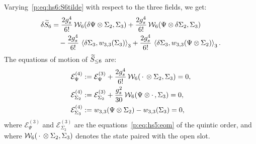 Varying~\eqref{p:eq:hs6:S6tilde} with respect to the three fields, we get:
\begin{equation}
  \label{p:eq:hs6:delta-S}
  \begin{aligned}
    \delta \caction[6]
      &
      = \frac{2 \gs^4}{6!} \, \dvertex{6}(\delta \Psi \otimes \Sigma_2, \Sigma_3)
        + \frac{2 \gs^4}{6!} \, \dvertex{6}(\Psi \otimes \delta \Sigma_2, \Sigma_3)
      \\ &
      \quad
      - \frac{2 \gs^4}{6!} \, \pair[3]{\delta \Sigma_3}{\wprod{3}{3}(\Sigma_3)}
        + \frac{2 \gs^4}{6!} \, \pair[3]{\delta \Sigma_3}{\wprod{3}{3}(\Psi \otimes \Sigma_2)}.
  \end{aligned}
\end{equation}
The equations of motion of $\caction[\le 6]$ are:
\begin{subequations}
  \label{p:eq:hs6:eom}
  \begin{align}
    \label{p:eq:hs6:eom-psi}
    \mathcal E^{(4)}_\Psi
      &
      := \mathcal E^{(3)}_\Psi
        + \frac{2 \gs^4}{6!} \, \dvertex{6}(\, \cdot \, \otimes \Sigma_2, \Sigma_3)
      = 0,
    \\
    \label{p:eq:hs6:eom-sigma2}
    \mathcal E^{(4)}_{\Sigma_2}
      &
      := \mathcal E^{(3)}_{\Sigma_2}
        + \frac{\gs^2}{30} \, \dvertex{6}(\Psi \otimes \cdot \,, \Sigma_3)
      = 0,
    \\
    \label{p:eq:hs6:eom-sigma3}
    \mathcal E^{(4)}_{\Sigma_3}
      &
      := \wprod{3}{3}(\Psi \otimes \Sigma_2) - \wprod{3}{3}(\Sigma_3)
      = 0,
  \end{align}
\end{subequations}
where $\mathcal E^{(3)}_\Psi$ and $\mathcal E^{(3)}_{\Sigma_2}$ are the equations~\eqref{p:eq:hs5:eom} of the quintic order, and where $\dvertex{6}(\, \cdot \, \otimes \Sigma_2, \Sigma_3)$ denotes the state paired with the open slot.

